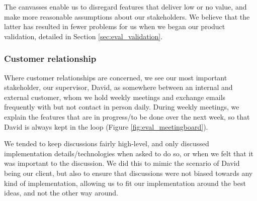 \documentclass[a4paper, titlepage]{article}
\begin{document}
The canvasses enable us to disregard features that deliver low or no value, and make more reasonable assumptions about our stakeholders. We believe that the latter has resulted in fewer problems for us when we began our product validation, detailed in Section \ref{sec:eval_validation}.




\subsubsection{Customer relationship}

Where customer relationships are concerned, we see our most important stakeholder, our supervisor, David, as somewhere between an internal and external customer, whom we hold weekly meetings and exchange emails frequently with but not contact in person daily. During weekly meetings, we explain the features that are in progress/to be done over the next week, so that David is always kept in the loop (Figure \ref{fig:eval_meetingboard}).

We tended to keep discussions fairly high-level, and only discussed implementation details/technologies when asked to do so, or when we felt that it was important to the discussion. We did this to mimic the scenario of David being our client, but also to ensure that discussions were not biased towards any kind of implementation, allowing us to fit our implementation around the best ideas, and not the other way around.
\end{document}

